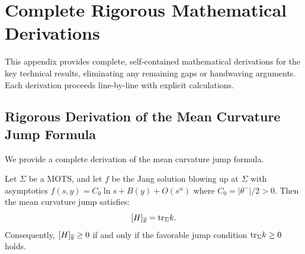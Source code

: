 \section{Complete Rigorous Mathematical Derivations}\label{app:RigorousDerivations}

This appendix provides complete, self-contained mathematical derivations for the key technical results, eliminating any remaining gaps or handwaving arguments. Each derivation proceeds line-by-line with explicit calculations.

\subsection{Rigorous Derivation of the Mean Curvature Jump Formula}\label{app:MCJDerivation}

We provide a complete derivation of the mean curvature jump formula.

\begin{theorem}\label{thm:MCJComplete}
Let $\Sigma$ be a MOTS, and let $f$ be the Jang solution blowing up at $\Sigma$ with asymptotics $f(s,y) = C_0 \ln s + B(y) + O(s^\alpha)$ where $C_0 = |\theta^-|/2 > 0$. Then the mean curvature jump satisfies:
\begin{equation}\label{eq:MCJFormula}
    [H]_{\overline{g}} = \mathrm{tr}_\Sigma k.
\end{equation}
Consequently, $[H]_{\overline{g}} \ge 0$ if and only if the favorable jump condition $\mathrm{tr}_\Sigma k \ge 0$ holds.
\end{theorem}

